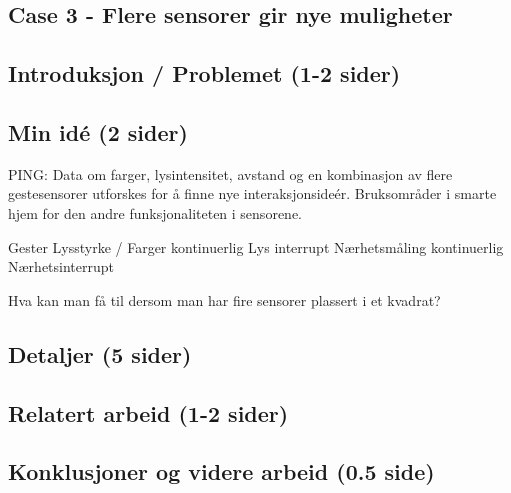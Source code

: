 \subsection{Case 3 - Flere sensorer gir nye muligheter}
\subsection*{Introduksjon / Problemet (1-2 sider)}

\subsection*{Min idé (2 sider)}
{\color{red}PING: Data om farger, lysintensitet, avstand og en kombinasjon av flere gestesensorer utforskes for å finne nye interaksjonsideér.}
Bruksområder i smarte hjem for den andre funksjonaliteten i sensorene.

Gester
Lysstyrke / Farger kontinuerlig
Lys interrupt
Nærhetsmåling kontinuerlig
Nærhetsinterrupt

Hva kan man få til dersom man har fire sensorer plassert i et kvadrat?

\subsection*{Detaljer (5 sider)}

\subsection*{Relatert arbeid (1-2 sider)}

\subsection*{Konklusjoner og videre arbeid (0.5 side)}
